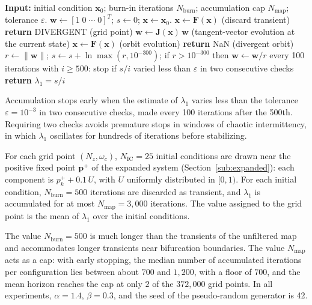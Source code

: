 \documentclass[journal]{IEEEtran}
\begin{document}
\begin{algorithm}[!t]
\caption{Single-vector estimation of $\lambda_1$ with periodic renormalization.}\label{alg:lyap}
\begin{algorithmic}[1]
\STATE \textbf{Input:} initial condition $\mathbf{x}_0$; burn-in iterations $N_{\text{burn}}$; accumulation cap $N_{\text{map}}$; tolerance $\varepsilon$.
\STATE $\mathbf{w}\leftarrow[1\;0\;\cdots\;0]^T$;\; $s\leftarrow 0$;\; $\mathbf{x}\leftarrow\mathbf{x}_0$.
  \STATE $\mathbf{x}\leftarrow\mathbf{F}(\mathbf{x})$ \quad(discard transient)
    \STATE \textbf{return} DIVERGENT \quad(grid point)
  \ENDIF
\ENDFOR
{}
  \STATE $\mathbf{w}\leftarrow\mathbf{J}(\mathbf{x})\,\mathbf{w}$ \quad(tangent-vector evolution at the current state)
  \STATE $\mathbf{x}\leftarrow\mathbf{F}(\mathbf{x})$ \quad(orbit evolution)
    \STATE \textbf{return} NaN \quad(divergent orbit)
  \ENDIF
    \STATE $r\leftarrow\|\mathbf{w}\|$;\; $s\leftarrow s+\ln\max(r,10^{-300})$;\; if $r>10^{-300}$ then $\mathbf{w}\leftarrow\mathbf{w}/r$
    \STATE every 100 iterations with $i\ge500$: stop if $s/i$ varied less than $\varepsilon$ in two consecutive checks
  \ENDIF
\ENDFOR
\STATE \textbf{return} $\lambda_1=s/i$
\end{algorithmic}
\end{algorithm}

Accumulation stops early when the estimate of $\lambda_1$ varies less than the
tolerance $\varepsilon=10^{-3}$ in two consecutive checks, made every 100
iterations after the 500th. Requiring two checks avoids premature stops in
windows of chaotic intermittency, in which $\lambda_1$ oscillates for hundreds
of iterations before stabilizing.

For each grid point $(N_z,\omega_c)$, $N_{\text{IC}}=25$ initial conditions are
drawn near the positive fixed point $\mathbf{p}^+$ of the expanded system
(Section~\ref{sub:expanded}): each component is $p_k^++0.1\,U$, with $U$
uniformly distributed in $[0,1)$. For each initial condition,
$N_{\text{burn}}=500$ iterations are discarded as transient, and $\lambda_1$ is
accumulated for at most $N_{\text{map}}=3{,}000$ iterations. The value
assigned to the grid point is the mean of $\lambda_1$ over the initial
conditions.

The value $N_{\text{burn}}=500$ is much longer than the transients of the
unfiltered map and accommodates longer transients near bifurcation
boundaries. The value
$N_{\text{map}}$ acts as a cap: with early stopping, the median number of
accumulated iterations per configuration lies between about $700$ and
$1{,}200$, with a floor of $700$, and the mean horizon reaches the cap at only $2$ of the
$372{,}000$ grid points. In all experiments,
$\alpha=1.4$, $\beta=0.3$,
and the seed of the pseudo-random generator is 42.
\end{document}

